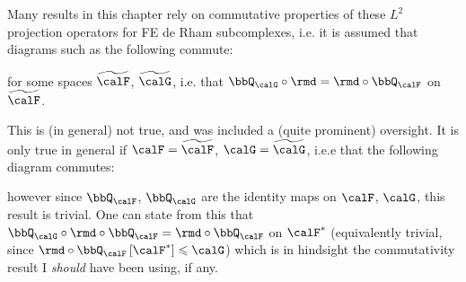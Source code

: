     \begin{remark}
        Many results in this chapter rely on commutative properties of these $L^{2}$ projection operators for FE de Rham subcomplexes, i.e. it is assumed that diagrams such as the following commute:
        \begin{center}\end{center}
        for some spaces $\widetilde{\calF}$, $\widetilde{\calG}$, i.e. that $\bbQ_{\calG}\circ\rmd = \rmd\circ\bbQ_{\calF}$ on $\widetilde{\calF}$.

        This is (in general) not true, and was included a (quite prominent) oversight. It is only true in general if $\calF = \widetilde{\calF}$, $\calG = \widetilde{\calG}$, i.e.e that the following diagram commutes:
        \begin{center}\end{center}
        however since $\bbQ_{\calF}$, $\bbQ_{\calG}$ are the identity maps on $\calF$, $\calG$, this result is trivial. One can state from this that $\bbQ_{\calG}\circ\rmd\circ\bbQ_{\calF} = \rmd\circ\bbQ_{\calF}$ on $\calF^{*}$ (equivalently trivial, since $\rmd\circ\bbQ_{\calF}\left[\calF^{*}\right] \leqslant \calG$) which is in hindsight the commutativity result I \emph{should} have been using, if any.


\end{remark}
